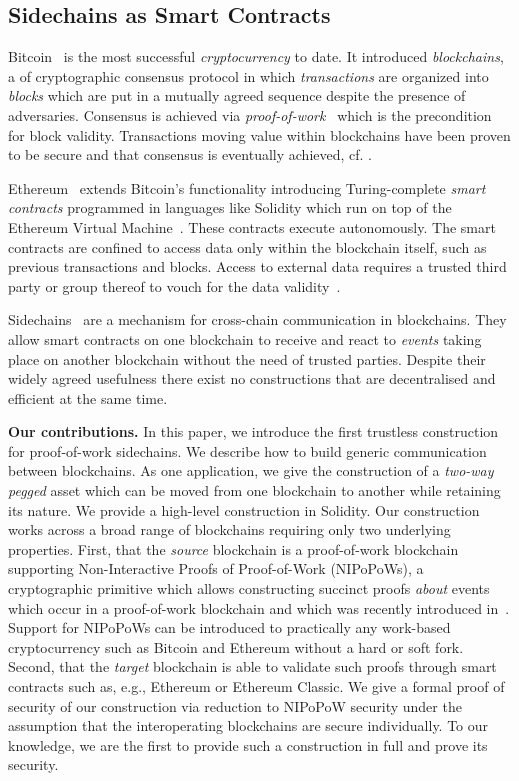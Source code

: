 \subsection{Sidechains as Smart Contracts}


Bitcoin~\cite{bitcoin} is the most successful \emph{cryptocurrency} to
date. It introduced \emph{blockchains}, a
of cryptographic consensus protocol in which \emph{transactions} are organized
into \emph{blocks} which are put in a mutually agreed sequence despite the
presence of adversaries. Consensus is achieved via
\emph{proof-of-work}~\cite{pow} which is the precondition for block
validity.  Transactions moving value within blockchains have been proven to
be secure and that consensus is eventually achieved, cf.
\cite{backbone,pass-asynchronous,varbackbone}.

Ethereum~\cite{buterin} extends Bitcoin's functionality introducing
Turing-complete \emph{smart contracts} programmed in
languages like Solidity which run on top of the Ethereum Virtual
Machine~\cite{wood}. These contracts execute autonomously. The smart contracts
are confined to access data only within the blockchain itself, such as previous
transactions and blocks. Access to external data requires a trusted
third party or group thereof to vouch for the data validity~\cite{towncrier}.

Sidechains~\cite{sidechains} are a mechanism for cross-chain communication in
blockchains. They allow smart contracts on one blockchain to receive and
react to \textit{events} taking place on another blockchain without the need
of trusted parties. Despite their widely agreed usefulness
there exist no constructions that are decentralised and efficient at the same
time.

\noindent\textbf{Our contributions. } In this paper, we introduce the first
trustless construction for proof-of-work sidechains. We describe how to build
generic communication between blockchains. As one application, we give the
construction of a \emph{two-way pegged} asset which can be moved from one
blockchain to another while retaining its nature. We provide a high-level
construction in Solidity. Our construction works across a broad range of
blockchains requiring only two underlying properties. First, that the
\emph{source} blockchain is a proof-of-work blockchain supporting
Non-Interactive Proofs of Proof-of-Work (NIPoPoWs), a cryptographic primitive
which allows constructing succinct proofs \emph{about} events which occur in a
proof-of-work blockchain and which was recently introduced in~\cite{nipopows}.
Support for NIPoPoWs can be introduced to practically any
work-based cryptocurrency such as Bitcoin and Ethereum without a hard or soft
fork. Second, that the \emph{target} blockchain is able to validate such proofs
through smart contracts such as, e.g., Ethereum or Ethereum
Classic.
We give a formal proof of security of our construction via
reduction to NIPoPoW security under the assumption that the interoperating
blockchains are secure individually.
To our knowledge, we are the first to
provide such a construction in
full and prove its security.

